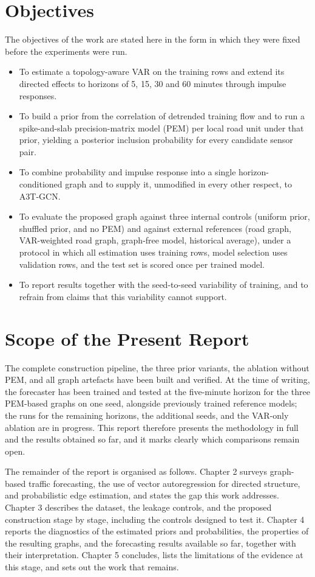 \documentclass[MTech]{ugthesis}
\begin{document}
\section{Objectives}
The objectives of the work are stated here in the form in which they were fixed before the experiments were run.
\begin{itemize}
\item To estimate a topology-aware VAR on the training rows and extend its directed effects to horizons of 5, 15, 30 and 60 minutes through impulse responses.
\item To build a prior from the correlation of detrended training flow and to run a spike-and-slab precision-matrix model (PEM) per local road unit under that prior, yielding a posterior inclusion probability for every candidate sensor pair.
\item To combine probability and impulse response into a single horizon-conditioned graph and to supply it, unmodified in every other respect, to A3T-GCN.
\item To evaluate the proposed graph against three internal controls (uniform prior, shuffled prior, and no PEM) and against external references (road graph, VAR-weighted road graph, graph-free model, historical average), under a protocol in which all estimation uses training rows, model selection uses validation rows, and the test set is scored once per trained model.
\item To report results together with the seed-to-seed variability of training, and to refrain from claims that this variability cannot support.
\end{itemize}

\section{Scope of the Present Report}
The complete construction pipeline, the three prior variants, the ablation without PEM, and all graph artefacts have been built and verified. At the time of writing, the forecaster has been trained and tested at the five-minute horizon for the three PEM-based graphs on one seed, alongside previously trained reference models; the runs for the remaining horizons, the additional seeds, and the VAR-only ablation are in progress. This report therefore presents the methodology in full and the results obtained so far, and it marks clearly which comparisons remain open.

The remainder of the report is organised as follows. Chapter 2 surveys graph-based traffic forecasting, the use of vector autoregression for directed structure, and probabilistic edge estimation, and states the gap this work addresses. Chapter 3 describes the dataset, the leakage controls, and the proposed construction stage by stage, including the controls designed to test it. Chapter 4 reports the diagnostics of the estimated priors and probabilities, the properties of the resulting graphs, and the forecasting results available so far, together with their interpretation. Chapter 5 concludes, lists the limitations of the evidence at this stage, and sets out the work that remains.
\end{document}

